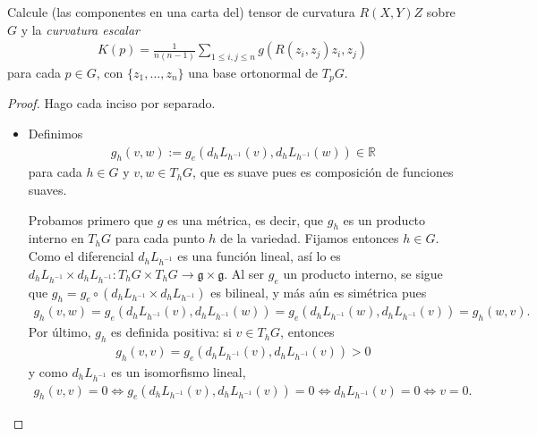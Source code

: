 \documentclass[11pt]{article}
\newcommand{\R}{\mathbb{R}}
\newcommand{\paint}[1]{\color{color}{#1}}
\newenvironment{exercise}[2][Ejercicio]{\begin{trivlist}
\item[\hskip \labelsep \paint{{\bfseries #1}}\hskip \labelsep {\bfseries #2.}]}{\end{trivlist}}
\begin{document}
\begin{exercise}{5}
\begin{itemize}[listparindent = \parindent]
Calcule (las componentes en una carta del) tensor de curvatura $R(X,Y)Z$ sobre $G$ y la \textit{curvatura escalar}
\begin{align*}
K(p) = \frac{1}{n(n-1)} \sum_{1 \leq i,j \leq n}g(R(z_i,z_j)z_i,z_j)
\end{align*}
para cada $p \in G$, con $\{z_1, \dots, z_n\}$ una base ortonormal de $T_pG$.
\end{itemize}
\end{exercise}
\begin{proof} Hago cada inciso por separado. 
\begin{itemize}[listparindent = \parindent]
\item[(a)] Definimos
\begin{align*}
g_h(v,w) := g_e(d_hL_{h^{-1}}(v),d_hL_{h^{-1}}(w)) \in \R
\end{align*}
para cada $h \in G$ y $v,w \in T_hG$, que es suave pues es composición de funciones suaves.  

Probamos primero que $g$ es una métrica, es decir, que $g_h$ es un producto interno en $T_hG$ para cada punto $h$ de la variedad. Fijamos entonces $h \in G$. Como el diferencial $d_hL_{h^{-1}}$ es una función lineal, así lo es $d_hL_{h^{-1}} \times d_hL_{h^{-1}} : T_hG \times T_hG \to \mathfrak{g} \times \mathfrak{g}$. Al ser $g_e$ un producto interno, se sigue que $g_h = g_e \circ (d_hL_{h^{-1}} \times d_hL_{h^{-1}})$ es bilineal, y más aún es simétrica pues 
\begin{align*}
g_h(v,w) = g_e(d_hL_{h^{-1}}(v),d_hL_{h^{-1}}(w)) = g_e(d_hL_{h^{-1}}(w),d_hL_{h^{-1}}(v)) = g_h(w,v).
\end{align*}
Por último, $g_h$ es definida positiva: si $v \in T_hG$, entonces
\begin{align*}
g_h(v,v) = g_e(d_hL_{h^{-1}}(v),d_hL_{h^{-1}}(v)) > 0
\end{align*}
y como $d_hL_{h^{-1}}$ es un isomorfismo lineal,
\begin{align*}
g_h(v,v) = 0\iff g_e(d_hL_{h^{-1}}(v),d_hL_{h^{-1}}(v)) = 0 \iff d_hL_{h^{-1}}(v) = 0\iff v = 0.
\end{align*}


\end{itemize}
\end{proof}
\end{document}
